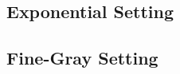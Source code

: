 \ifnum{}
\ifnum{}


\tableSimsCoeff
\fi
\fi

\subsection{Exponential Setting}


\subsection{Fine-Gray Setting}
\label{sec:finegray}
